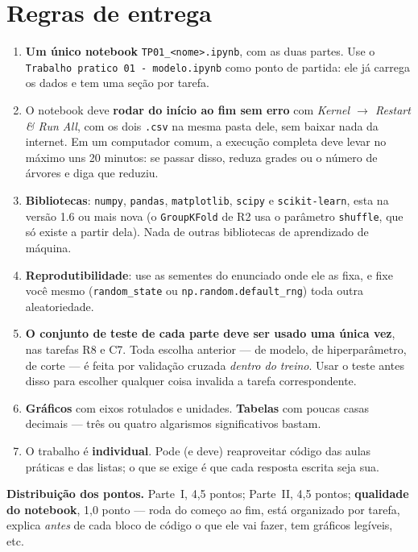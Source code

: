 \documentclass[11pt,a4paper]{article}
\newcommand{\cod}[1]{\texttt{#1}}
\begin{document}
\section{Regras de entrega}\label{sec:regras}
\begin{enumerate}[leftmargin=1.4cm]
  \item \textbf{Um único notebook} \cod{TP01\_<nome>.ipynb}, com as duas
        partes. Use o \cod{Trabalho pratico 01 - modelo.ipynb} como ponto de partida: ele já
        carrega os dados e tem uma seção por tarefa.
  \item O notebook deve \textbf{rodar do início ao fim sem erro} com
        \emph{Kernel $\to$ Restart \& Run All}, com os dois \cod{.csv} na mesma pasta
        dele, sem baixar nada da internet. Em um computador comum, a execução
        completa deve levar no máximo uns 20 minutos: se passar disso, reduza grades
        ou o número de árvores e diga que reduziu.
  \item \textbf{Bibliotecas}: \cod{numpy}, \cod{pandas}, \cod{matplotlib},
        \cod{scipy} e \cod{scikit-learn}, esta na versão 1.6 ou mais nova (o
        \cod{GroupKFold} de R2 usa o parâmetro \cod{shuffle}, que só existe a partir
        dela). Nada de outras bibliotecas de aprendizado de máquina.
  \item \textbf{Reprodutibilidade}: use as sementes do enunciado onde ele as fixa, e
        fixe você mesmo (\cod{random\_state} ou \cod{np.random.default\_rng}) toda
        outra aleatoriedade.
  \item \textbf{O conjunto de teste de cada parte deve ser usado uma única vez}, nas
        tarefas R8 e C7. Toda escolha anterior --- de modelo, de hiperparâmetro, de
        corte --- é feita por validação cruzada \emph{dentro do treino}. Usar o
        teste antes disso para escolher qualquer coisa invalida a tarefa
        correspondente.
  \item \textbf{Gráficos} com eixos rotulados e unidades. \textbf{Tabelas} com
        poucas casas decimais --- três ou quatro algarismos significativos bastam.
  \item O trabalho é \textbf{individual}. Pode (e deve) reaproveitar código das
        aulas práticas e das listas; o que se exige é que cada resposta escrita seja
        sua.
\end{enumerate}

\noindent
\textbf{Distribuição dos pontos.} Parte~I, 4,5 pontos; Parte~II, 4,5 pontos;
\textbf{qualidade do notebook}, 1,0 ponto --- roda do começo ao fim, está
organizado por tarefa, explica \emph{antes} de cada bloco de código o que ele vai
fazer, tem gráficos legíveis, etc.
\end{document}
